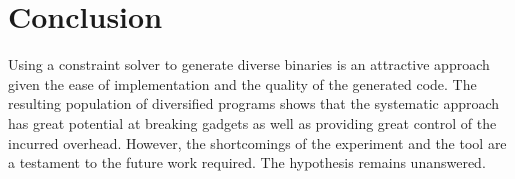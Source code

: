 \section{Conclusion}

Using a constraint solver to generate diverse binaries is an attractive approach given
the ease of implementation and the quality of the generated code. The resulting population
of diversified programs shows that the systematic approach has great potential at breaking
gadgets as well as providing great control of the incurred overhead. However, the
shortcomings of the experiment and the tool are a testament to the future work required.
The hypothesis remains unanswered.
